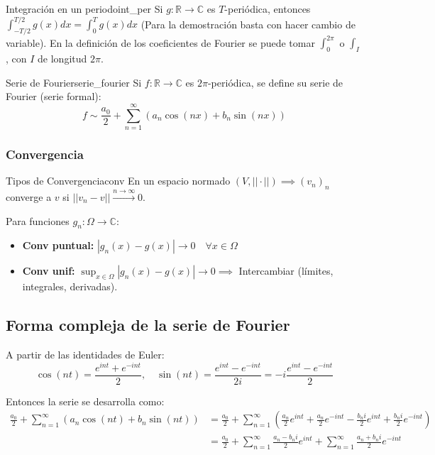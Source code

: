 \begin{nota}{Integración en un periodo}{int_per}
Si $g: \mathbb{R} \to \mathbb{C}$ es $T$-periódica, entonces $\int_{-T/2}^{T/2} g(x) dx = \int_0^T g(x) dx$ (Para la demostración basta con hacer cambio de variable). En la definición de los coeficientes de Fourier se puede tomar $\int_0^{2\pi}$ o $\int_I$, con $I$ de longitud $2\pi$.
\end{nota}

\begin{definicion}{Serie de Fourier}{serie_fourier}
Si $f: \mathbb{R} \to \mathbb{C}$ es $2\pi$-periódica, se define su serie de Fourier (serie formal):
$$ f \sim \frac{a_0}{2} + \sum_{n=1}^{\infty} \left( a_n \cos(nx) + b_n \sin(nx) \right) $$
\end{definicion}

\subsubsection{Convergencia}

\begin{nota}{Tipos de Convergencia}{conv}
En un espacio normado $(V, ||\cdot||) \implies (v_n)_n$ converge a $v$ si $||v_n - v|| \xrightarrow{n \to \infty} 0$.

Para funciones $g_n: \Omega \to \mathbb{C}$:
\begin{itemize}
    \item \textbf{Conv puntual:} $|g_n(x) - g(x)| \to 0 \quad \forall x \in \Omega$
    \item \textbf{Conv unif:} $\sup_{x \in \Omega} |g_n(x) - g(x)| \to 0 \implies$ Intercambiar (límites, integrales, derivadas).
\end{itemize}
\end{nota}
\subsection{Forma compleja de la serie de Fourier}

A partir de las identidades de Euler:
\begin{equation*}
    \cos(nt) = \frac{e^{int} + e^{-int}}{2}, \quad \sin(nt) = \frac{e^{int} - e^{-int}}{2i} = -i \frac{e^{int} - e^{-int}}{2}
\end{equation*}

Entonces la serie se desarrolla como:
\begin{align*}
    \frac{a_0}{2} + \sum_{n=1}^{\infty} (a_n \cos(nt) + b_n \sin(nt)) &= \frac{a_0}{2} + \sum_{n=1}^{\infty} \left( \frac{a_n}{2} e^{int} + \frac{a_n}{2} e^{-int} - \frac{b_n i}{2} e^{int} + \frac{b_n i}{2} e^{-int} \right) \\
    &= \frac{a_0}{2} + \sum_{n=1}^{\infty} \frac{a_n - b_n i}{2} e^{int} + \sum_{n=1}^{\infty} \frac{a_n + b_n i}{2} e^{-int}
\end{align*}

